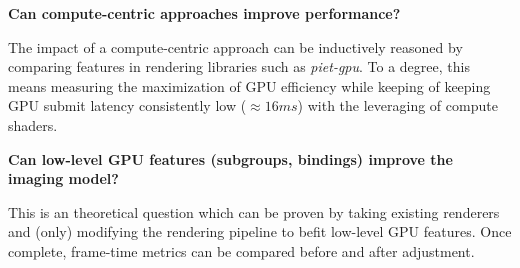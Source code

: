 \textbf{Can compute-centric approaches improve performance?}\\
\begin{adjustwidth}{2cm}{}
The impact of a compute-centric approach can be inductively reasoned by comparing features in rendering libraries such as \textit{piet-gpu}. To a degree, this means measuring the maximization of GPU efficiency while keeping of keeping GPU submit latency consistently low ($\approx16ms$) with the leveraging of compute shaders.\\
\end{adjustwidth}

\textbf{Can low-level GPU features (subgroups, bindings) improve the imaging model?}\\
\begin{adjustwidth}{2cm}{}
This is an theoretical question which can be proven by taking existing renderers and (only) modifying the rendering pipeline to befit low-level GPU features. Once complete, frame-time metrics can be compared before and after adjustment.
\end{adjustwidth}

